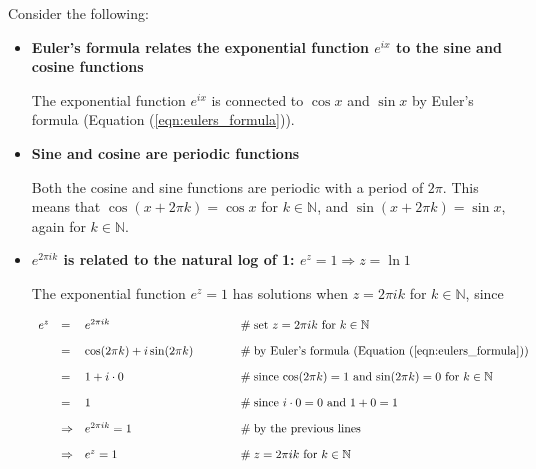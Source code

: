 \documentclass{article}
\theoremstyle{definition}
\begin{document}
\medskip
Consider the following:

\begin{itemize}
\item {\bf Euler's formula relates the exponential function $e^{ix}$ to the sine and cosine functions}

\medskip
The exponential function $e^{ix}$ is connected to $\cos x$ and
$\sin x$ by Euler's formula (Equation (\ref{eqn:eulers_formula})).


\item {\bf Sine and cosine are periodic functions}

\medskip
Both the cosine and sine functions are periodic with a period of 
$2\pi$. This means that $\cos(x+2\pi k) = \cos x$ for $k \in \mathbb{N}$, 
and $\sin(x+2\pi k) = \sin x$, again for $k \in \mathbb{N}$.

\item {\bf $e^{2\pi ik}$ is related to the natural log of 1: $e^z = 1 \Rightarrow z = \ln 1$}

\medskip
The exponential function $e^z = 1$ has solutions when
$z = 2\pi i k$ for $k \in \mathbb{N}$, since 

\smallskip
\begin{equation*}
\begin{array}{lllll}
e^z
&=& e^{2\pi ik} 
		&\hspace{3em} \mathrel{\#} \text{set $z = 2\pi i k$ for $k \in \mathbb{N}$} \\
[10pt]
&=& \cos(2\pi k) + i\sin(2\pi k) 
		&\hspace{3em} \mathrel{\#} \text{by Euler's formula (Equation (\ref{eqn:eulers_formula}))} \\
[10pt]
&=& 1 + i \cdot 0
		&\hspace{3em} \mathrel{\#} \text{since $\cos(2\pi k) = 1$ and $\sin(2\pi k) = 0$ for $k \in \mathbb{N}$} \\
[10pt]
&=& 1 
		&\hspace{3em} \mathrel{\#} \text{since $i \cdot 0 = 0$ and $1+0 = 1$} \\
[10pt]
&\Rightarrow& e^{2\pi ik} = 1 
		&\hspace{3em} \mathrel{\#} \text{by the previous lines} \\
[10pt]
&\Rightarrow& e^{z} = 1 
		&\hspace{3em} \mathrel{\#} \text{$z = 2\pi i k$ for $k \in \mathbb{N}$}

\end{array}
\end{equation*}
\end{itemize}
\end{document}
